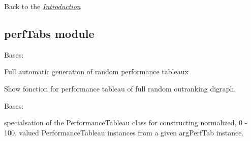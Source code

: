 \documentclass[letterpaper,10pt,english]{sphinxmanual}
\begin{document}
\begin{fulllineitems}
\begin{fulllineitems}
\label{techDoc:graphs.TriangularGraph.showShort}
\end{fulllineitems}


\end{fulllineitems}


Back to the {\hyperref[techDoc:technical-label]{\emph{Introduction}}}


\subsection{perfTabs module}
\label{techDoc:module-perfTabs}\label{techDoc:perftabs-label}\label{techDoc:perftabs-module}

\begin{fulllineitems}
\label{techDoc:perfTabs.FullRandomPerformanceTableau}
Bases: {\hyperref[techDoc:perfTabs.PerformanceTableau]{}}

Full automatic generation of random performance tableaux

\begin{fulllineitems}
\label{techDoc:perfTabs.FullRandomPerformanceTableau.showAll}
Show fonction for performance tableau of full random outranking digraph.

\end{fulllineitems}


\end{fulllineitems}


\begin{fulllineitems}
\label{techDoc:perfTabs.NormalizedPerformanceTableau}
Bases: {\hyperref[techDoc:perfTabs.PerformanceTableau]{}}

specialsation of the PerformanceTableau class for
constructing normalized, 0 - 100, valued PerformanceTableau
instances from a given argPerfTab instance.

\end{fulllineitems}
\end{document}
